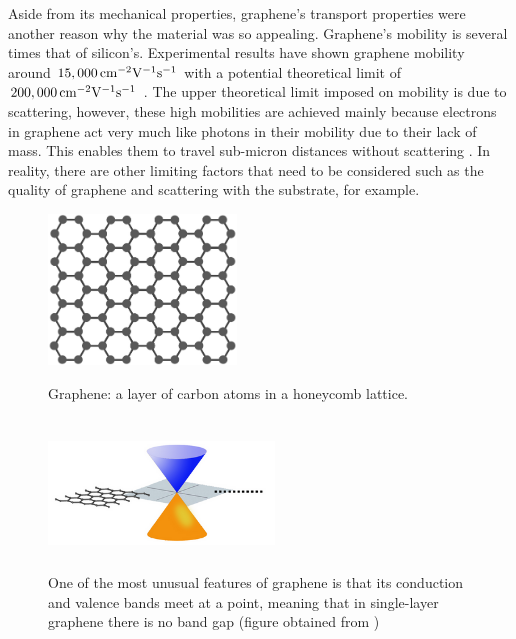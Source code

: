 \noindent Aside from its mechanical properties, graphene's transport properties were another reason why the material was so appealing. Graphene's mobility is several times that of silicon's. Experimental results have shown graphene mobility around $15,000\,\mathrm{cm}^{-2}\mathrm{V}^{-1}\mathrm{s}^{-1}$ with a potential theoretical limit of $200,000\,\mathrm{cm}^{-2}\mathrm{V}^{-1}\mathrm{s}^{-1}$ \cite{Dargys_Encylco1994,Akinwande_NatureComm2014}. The upper theoretical limit imposed on mobility is due to scattering, however, these high mobilities are achieved mainly because electrons in graphene act very much like photons in their mobility due to their lack of mass. This enables them to travel sub-micron distances without scattering \cite{Novoselov_NatureMat2007}. In reality, there are other limiting factors that need to be considered such as the quality of graphene and scattering with the substrate, for example. \\

\begin{figure}[ht]
	\centering
	\begin{minipage}[b]{0.45\linewidth}
		\includegraphics[height=4cm,width=5cm]{figs/graphene_honeycomb}
		\caption[Graphene honeycomb lattice]{Graphene: a layer of carbon atoms in a honeycomb lattice.}
		\label{fig:graphene_honeycomb}
	\end{minipage}
	\qquad
	\begin{minipage}[b]{0.45\linewidth}
		\includegraphics[height=4cm,width=6cm]{figs/graphene_bandgap}
		\caption[Bandgap of graphene]{One of the most unusual features of graphene is that its conduction and valence bands meet at a point, meaning that in single-layer graphene there is no band gap (figure obtained from \cite{Berkley_Online2009})}
		\label{fig:graphene_bandgap}
	\end{minipage}
\end{figure}

